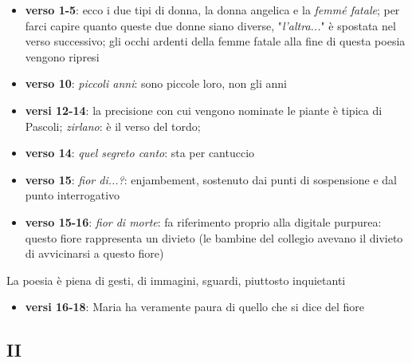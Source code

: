 \documentclass[a4paper, twoside, titlepage]{book}
\newcommand{\elenco}[1]{%
\begin{itemize}
#1
\end{itemize}}
\begin{document}
\elenco{\item \textbf{verso 1-5}: ecco i due tipi di donna, la donna angelica e la \textit{femmé fatale}; per farci capire quanto queste due donne siano diverse, "\textit{l'altra...}" è spostata nel verso successivo; gli occhi ardenti della femme fatale alla fine di questa poesia vengono ripresi
\item \textbf{verso 10}: \textit{piccoli anni}: sono piccole loro, non gli anni
\item \textbf{versi 12-14}: la precisione con cui vengono nominate le piante è tipica di Pascoli; \textit{zirlano}: è il verso del tordo;
\item \textbf{verso 14}: \textit{quel segreto canto}: sta per cantuccio
\item \textbf{verso 15}: \textit{fior di...?}: enjambement, sostenuto dai punti di sospensione e dal punto interrogativo
\item \textbf{verso 15-16}: \textit{fior di morte}: fa riferimento proprio alla digitale purpurea: questo fiore rappresenta un divieto (le bambine del collegio avevano il divieto di avvicinarsi a questo fiore)
}
La poesia è piena di gesti, di immagini, sguardi, piuttosto inquietanti

\elenco{\item \textbf{versi 16-18}: Maria ha veramente paura di quello che si dice del fiore
}

\subsection*{II}
\end{document}
